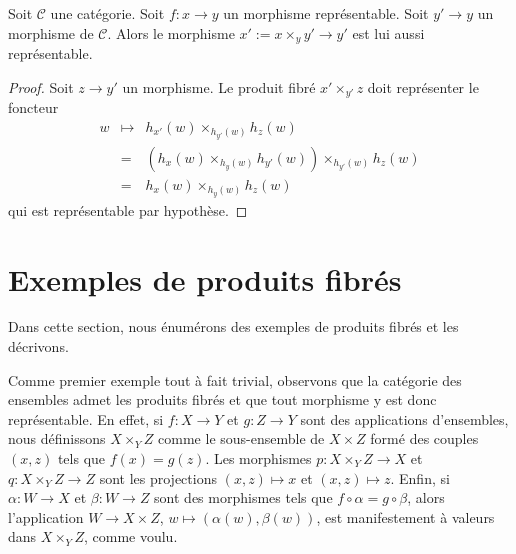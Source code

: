 \begin{lemma}
\label{lemma-base-change-representable}
Soit $\mathcal{C}$ une catégorie.
Soit $f : x \to y$ un morphisme représentable.
Soit $y' \to y$ un morphisme de $\mathcal{C}$.
Alors le morphisme $x' := x \times_y y' \to y'$ est lui aussi représentable.
\end{lemma}

\begin{proof}
Soit $z \to y'$ un morphisme. Le produit fibré
$x' \times_{y'} z$ doit représenter le foncteur
\begin{eqnarray*}
w & \mapsto & h_{x'}(w)\times_{h_{y'}(w)} h_z(w) \\
& = & (h_x(w) \times_{h_y(w)} h_{y'}(w)) \times_{h_{y'}(w)} h_z(w) \\
& = & h_x(w) \times_{h_y(w)} h_z(w)
\end{eqnarray*}
qui est représentable par hypothèse.
\end{proof}

\section{Exemples de produits fibrés}
\label{section-example-fibre-products}

\noindent
Dans cette section, nous énumérons des exemples de produits fibrés
et les décrivons.

\medskip\noindent
Comme premier exemple tout à fait trivial, observons
que la catégorie des ensembles admet les produits fibrés et que tout
morphisme y est donc représentable. En effet, si $f : X \to Y$
et $g : Z \to Y$ sont des applications d'ensembles, nous définissons
$X \times_Y Z$ comme le sous-ensemble de $X \times Z$ formé
des couples $(x, z)$ tels que $f(x) = g(z)$. Les morphismes
$p : X \times_Y Z \to X$ et $q : X \times_Y Z \to Z$ sont
les projections $(x, z) \mapsto x$ et $(x, z) \mapsto z$.
Enfin, si $\alpha : W \to X$ et $\beta : W \to Z$
sont des morphismes tels que $f \circ \alpha = g \circ \beta$,
alors l'application $W \to X \times Z$, $w\mapsto (\alpha(w), \beta(w))$,
est manifestement à valeurs dans $X \times_Y Z$, comme voulu.

